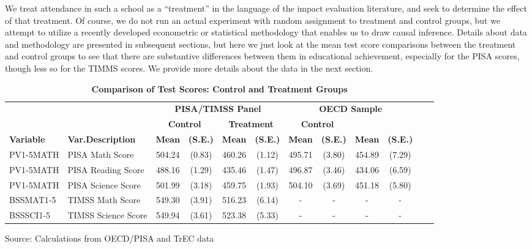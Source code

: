 \documentclass[alpha-refs,fleqn]{wiley-article_p2}
\begin{document}
We treat attendance in such a school as a ``treatment'' in the language of the impact evaluation literature, and seek to determine the effect of that treatment. Of course, we do not run an actual experiment with random assignment to treatment and control groups, but we attempt to utilize a recently developed econometric or statistical methodology that enables us to draw causal inference. Details about data and methodology are presented in subsequent sections, but here we just look at the mean test score comparisons between the treatment and control groups to see that there are substantive differences between them in educational achievement, especially for the PISA scores, though less so for the TIMMS scores. We provide more details about the data in the next section.

\begin{group}
\smaller
\begin{table}[h]
\caption{\textbf{Comparison of Test Scores: Control and Treatment Groups}}\label{table:1}
\begin{threeparttable}
\setlength{\tabcolsep}{5pt}
\renewcommand{\arraystretch}{1.25}
\begin{tabular}{p{1.7cm}p{2.8cm}cccccccccc}
\rowcolor{grey!30} 
& & \multicolumn{4}{c}{\textbf{PISA/TIMSS Panel}}  & \multicolumn{4}{c}{\textbf{OECD Sample}}  \\
& & \multicolumn{2}{c}{\textbf{Control}} & \multicolumn{2}{c}{\textbf{Treatment}} & \multicolumn{2}{c}{\textbf{Control}}  \multicolumn{2}{c}{\textbf{Treatment}} \\
\rowcolor{grey!30} 
 \textbf{Variable} & \textbf{Var.Description} &  \textbf{Mean} & \textbf{(S.E.)} & \textbf{Mean} & \textbf{(S.E.)} & \textbf{Mean} & \textbf{(S.E.)} & \textbf{Mean} & \textbf{(S.E.)}    \\
\rowcolor{white} 
PV1-5MATH & PISA Math Score  & 504.24 & (0.83)  & 460.26 & (1.12)   & 495.71 & (3.80) & 454.89 & (7.29)  \\
\rowcolor{grey!10} 
PV1-5MATH & PISA Reading Score      & 488.16 & (1.29)  & 435.46 & (1.47)   & 496.87 & (3.46) & 434.06 & (6.59)  \\
\rowcolor{white} 
PV1-5MATH & PISA Science Score      & 501.99 & (3.18)  & 459.75 & (1.93)   & 504.10 & (3.69) & 451.18 & (5.80)  \\
\rowcolor{grey!10} 
BSSMAT1-5 & TIMSS Math Score & 549.30 & (3.91)  & 516.23 & (6.14)  & -    &-  & - & -  \\
\rowcolor{white} 
BSSSCI1-5 & TIMSS Science Score  & 549.94 & (3.61)  & 523.38 & (5.33) & - & - & - & -  \\
\hline  %
\end{tabular}
\begin{tablenotes}
\item Source: Calculations from OECD/PISA and TrEC data
\end{tablenotes}
\end{threeparttable}
\end{table}
\end{group} 
\end{document}
